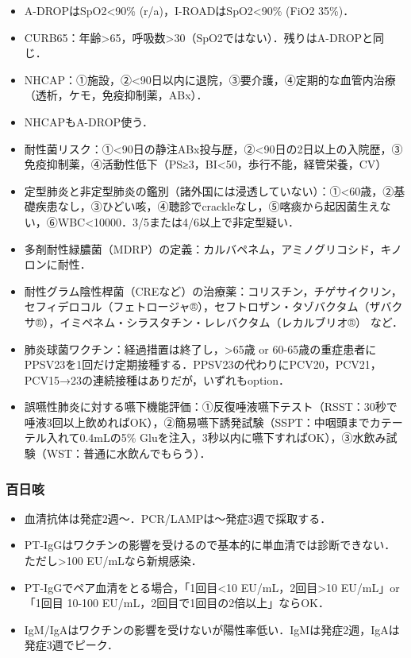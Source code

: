 \begin{itemize}
\item A-DROPはSpO2<90\% (r/a)，I-ROADはSpO2<90\% (FiO2 35\%)．
\item CURB65：年齢>65，呼吸数>30（SpO2ではない）．残りはA-DROPと同じ．
\item NHCAP：①施設，②<90日以内に退院，③要介護，④定期的な血管内治療（透析，ケモ，免疫抑制薬，ABx）．
\item NHCAPもA-DROP使う．
\item 耐性菌リスク：①<90日の静注ABx投与歴，②<90日の2日以上の入院歴，③免疫抑制薬，④活動性低下（PS≥3，BI<50，歩行不能，経管栄養，CV）


\item 定型肺炎と非定型肺炎の鑑別（諸外国には浸透していない）：①<60歳，②基礎疾患なし，③ひどい咳，④聴診でcrackleなし，⑤喀痰から起因菌生えない，⑥WBC<10000．3/5または4/6以上で非定型疑い．
\item 多剤耐性緑膿菌（MDRP）の定義：カルバペネム，アミノグリコシド，キノロンに耐性．
\item 耐性グラム陰性桿菌（CREなど）の治療薬：コリスチン，チゲサイクリン，セフィデロコル（フェトロージャ®），セフトロザン・タゾバクタム（ザバクサ®），イミペネム・シラスタチン・レレバクタム（レカルブリオ®）
など．
\item 肺炎球菌ワクチン：経過措置は終了し，>65歳 or 60-65歳の重症患者にPPSV23を1回だけ定期接種する．PPSV23の代わりにPCV20，PCV21，PCV15→23の連続接種はありだが，いずれもoption．


\item 誤嚥性肺炎に対する嚥下機能評価：①反復唾液嚥下テスト（RSST：30秒で唾液3回以上飲めればOK），②簡易嚥下誘発試験（SSPT：中咽頭までカテーテル入れて0.4mLの5\% Gluを注入，3秒以内に嚥下すればOK），③水飲み試験（WST：普通に水飲んでもらう）．
\end{itemize}


\subsubsection{百日咳}

\begin{itemize}
\item 血清抗体は発症2週〜．PCR/LAMPは〜発症3週で採取する．
\item PT-IgGはワクチンの影響を受けるので基本的に単血清では診断できない．ただし>100 EU/mLなら新規感染．
\item PT-IgGでペア血清をとる場合，「1回目<10 EU/mL，2回目>10 EU/mL」or「1回目 10-100 EU/mL，2回目で1回目の2倍以上」ならOK．
\item IgM/IgAはワクチンの影響を受けないが陽性率低い．IgMは発症2週，IgAは発症3週でピーク．
\end{itemize}


